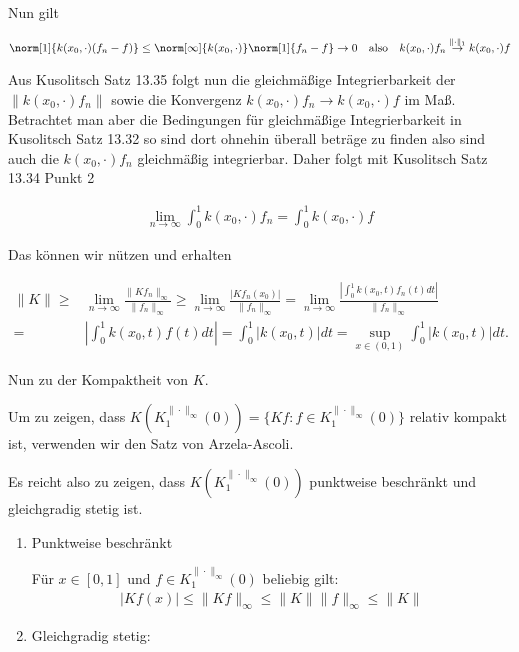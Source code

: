 \begin{solution}
Nun gilt 

\begin{align*}
  \norm[1]{k(x_0, \cdot) (f_n - f)} \leq \norm[\infty]{k(x_0, \cdot)} \norm[1]{f_n - f} \to 0 \quad \textrm{also} \quad k(x_0, \cdot)f_n \stackrel{\|\cdot\|_1}{\to} k(x_0, \cdot)f
\end{align*}

Aus Kusolitsch Satz 13.35 folgt nun die gleichmäßige Integrierbarkeit der $\|k(x_0, \cdot)f_n\|$ sowie die Konvergenz $k(x_0, \cdot)f_n \to k(x_0, \cdot)f$ im Maß. Betrachtet man aber die Bedingungen für gleichmäßige Integrierbarkeit in Kusolitsch Satz 13.32 so sind dort ohnehin überall beträge zu finden also sind auch die $k(x_0, \cdot)f_n$ gleichmäßig integrierbar. Daher folgt mit Kusolitsch Satz 13.34 Punkt 2 

\begin{align}
  \lim_{n \to \infty} \int_0^1 k(x_0, \cdot) f_n = \int_0^1 k(x_0, \cdot) f
\end{align}

Das können wir nützen und erhalten

\begin{align*}
  \|K\| \geq& \lim_{n \to \infty} \frac{\|Kf_n\|_\infty}{\|f_n\|_\infty} \geq \lim_{n \to \infty} \frac{|Kf_n(x_0)|}{\|f_n\|_\infty} = \lim_{n \to \infty} \frac{|\int_{0}^{1} k(x_0,t)f_n(t) dt|}{\|f_n\|_\infty} \\
  =& |\int_{0}^{1} k(x_0,t)f(t) dt| = \int_{0}^{1} |k(x_0,t)| dt = \sup_{x \in (0,1)} \int_{0}^{1} |k(x_0,t)| dt.
\end{align*}


Nun zu der Kompaktheit von $K$.

 Um zu zeigen, dass $K(K_{1}^{\|\cdot\|_{\infty}}(0)) = \{Kf : f \in K_{1}^{\|\cdot\|_{\infty}}(0)\}$ relativ kompakt ist, verwenden wir den Satz von Arzela-Ascoli.

 Es reicht also zu zeigen, dass $K(K_{1}^{\|\cdot\|_{\infty}}(0))$ punktweise beschränkt und gleichgradig stetig ist.

 \begin{enumerate}

 \item Punktweise beschränkt

 Für $x \in [0,1]$ und $f \in K_{1}^{\|\cdot\|_{\infty}}(0)$ beliebig gilt:
\begin{align*}
  |Kf(x)| \leq \|Kf\|_{\infty} \leq \|K\| \|f\|_{\infty} \leq \|K\|
\end{align*}

\item Gleichgradig stetig:


\end{enumerate}
\end{solution}
